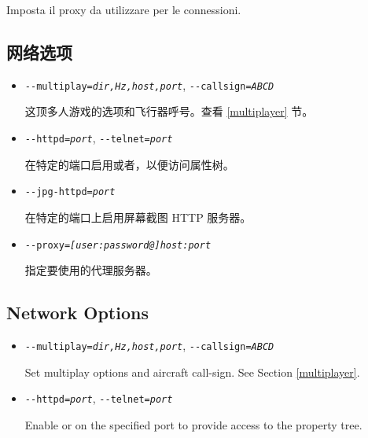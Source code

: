 \begin{itemize}
{\begin{itemize}
  Imposta il proxy da utilizzare per le connessioni.

  \end{itemize}
}
\ifchinese
{
  \subsection{网络选项}
\begin{itemize}
  \item{\texttt{-$ $-multiplay={\it dir,Hz,host,port}}, \texttt{-$ $-callsign={\it ABCD}}}

  这顶多人游戏的选项和飞行器呼号。查看 \ref{multiplayer} 节。

\item{\texttt{-$ $-httpd={\it port}}, \texttt{-$ $-telnet={\it port}}}

 在特定的端口启用或者，以便访问属性树。

\item{\texttt{-$ $-jpg-httpd={\it port}}}

 在特定的端口上启用屏幕截图 HTTP 服务器。

\item{\texttt{-$ $-proxy={\it [user:password@]host:port}}}

 指定要使用的代理服务器。
\end{itemize}
}
\fi
\iffalse
{
  \subsection{Network Options}
  \begin{itemize}
  \item{\texttt{-$ $-multiplay={\it dir,Hz,host,port}}, \texttt{-$ $-callsign={\it ABCD}}}

  Set multiplay options and aircraft call-sign. See Section \ref{multiplayer}.

  \item{\texttt{-$ $-httpd={\it port}}, \texttt{-$ $-telnet={\it port}}}

  Enable  or  on the specified port to provide
  access to the property tree.


\end{itemize}}
\end{itemize}
